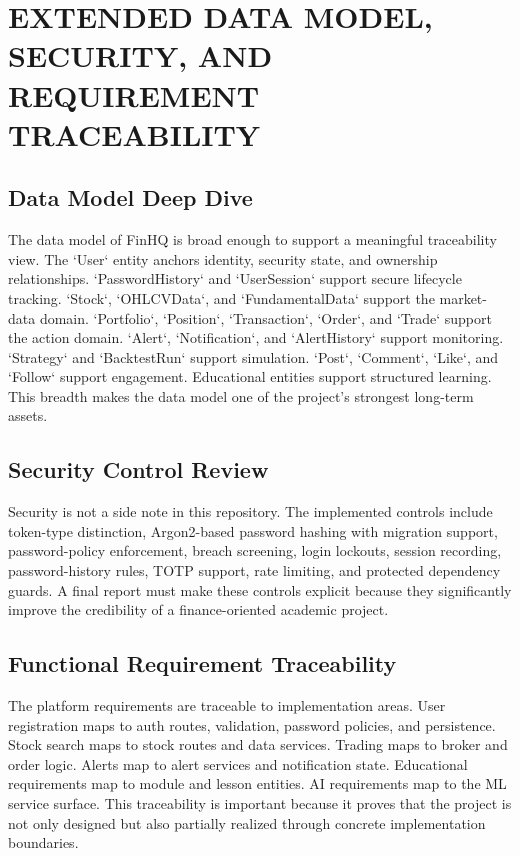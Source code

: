 \documentclass[12pt,a4paper]{report}
\newcommand{\projectshort}{FinHQ}
\begin{document}
\chapter{EXTENDED DATA MODEL, SECURITY, AND REQUIREMENT TRACEABILITY}
\section{Data Model Deep Dive}
The data model of \projectshort{} is broad enough to support a meaningful traceability view. The `User` entity anchors identity, security state, and ownership relationships. `PasswordHistory` and `UserSession` support secure lifecycle tracking. `Stock`, `OHLCVData`, and `FundamentalData` support the market-data domain. `Portfolio`, `Position`, `Transaction`, `Order`, and `Trade` support the action domain. `Alert`, `Notification`, and `AlertHistory` support monitoring. `Strategy` and `BacktestRun` support simulation. `Post`, `Comment`, `Like`, and `Follow` support engagement. Educational entities support structured learning. This breadth makes the data model one of the project's strongest long-term assets.

\section{Security Control Review}
Security is not a side note in this repository. The implemented controls include token-type distinction, Argon2-based password hashing with migration support, password-policy enforcement, breach screening, login lockouts, session recording, password-history rules, TOTP support, rate limiting, and protected dependency guards. A final report must make these controls explicit because they significantly improve the credibility of a finance-oriented academic project.

\section{Functional Requirement Traceability}
The platform requirements are traceable to implementation areas. User registration maps to auth routes, validation, password policies, and persistence. Stock search maps to stock routes and data services. Trading maps to broker and order logic. Alerts map to alert services and notification state. Educational requirements map to module and lesson entities. AI requirements map to the ML service surface. This traceability is important because it proves that the project is not only designed but also partially realized through concrete implementation boundaries.
\end{document}
